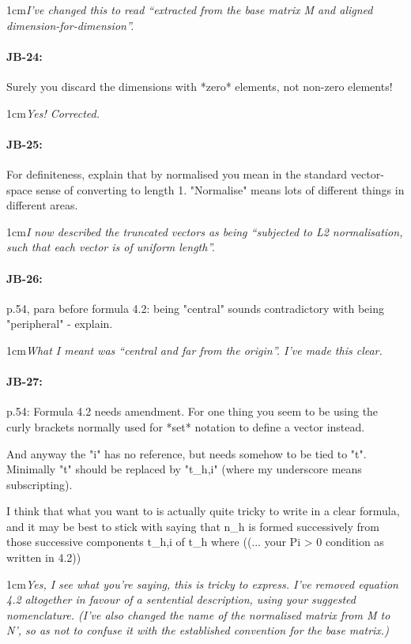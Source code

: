 \documentclass[11pt,a4paper]{article}
\newcommand{\res}[1]{\vspace{0.25cm} \begin{adjustwidth}{1cm}{}\emph{#1}\end{adjustwidth}}
\begin{document}
\res{I've changed this to read ``extracted from the base matrix M and aligned dimension-for-dimension''.}

\paragraph{JB-24:} Surely you discard the dimensions with *zero* elements, not non-zero elements!

\res{Yes!  Corrected.}

\paragraph{JB-25:} For definiteness, explain that by normalised you mean in the standard vector-space sense of converting to length 1. "Normalise" means lots of different things in different areas.

\res{I now described the truncated vectors as being ``subjected to L2 normalisation, such that each vector is of uniform length''.}

\paragraph{JB-26:} p.54, para before formula 4.2: being "central" sounds contradictory with being "peripheral" - explain.

\res{What I meant was ``central and far from the origin''.  I've made this clear.}

\paragraph{JB-27:} p.54: Formula 4.2 needs amendment. For one thing you seem to be using the curly brackets normally used for *set* notation to define a vector instead.

And anyway the "i" has no reference, but needs somehow to be tied to "t". Minimally "t" should be replaced by "t\_h,i" (where my underscore means subscripting).

I think that what you want to is actually quite tricky to write in a clear formula, and it may be best to stick with saying that n\_h is formed successively from those successive components t\_h,i of t\_h where ((... your Pi > 0 condition as written in 4.2))

\res{Yes, I see what you're saying, this is tricky to express.  I've removed equation 4.2 altogether in favour of a sentential description, using your suggested nomenclature.  (I've also changed the name of the normalised matrix from M to N', so as not to confuse it with the established convention for the base matrix.)}
\end{document}
